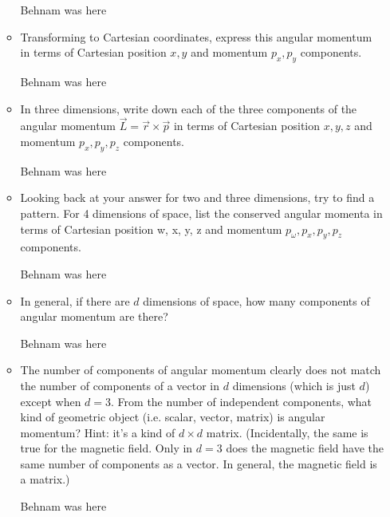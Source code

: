 \documentclass[fleqn]{article}
\begin{document}
\begin{enumerate}
\begin{itemize}
        \textcolor{hwColor}{
          Behnam was here
        }

      \item Transforming to Cartesian coordinates, express this angular momentum in terms of Cartesian position
      $x, y$ and momentum $p_x, p_y$ components.

        \textcolor{hwColor}{
          Behnam was here
        }

      \item In three dimensions, write down each of the three components of
      the angular momentum $\overrightarrow{L}=\overrightarrow{r} \times \overrightarrow{p}$ in terms of Cartesian position
      $x,y,z$ and momentum $p_x, p_y, p_z$ components.

        \textcolor{hwColor}{
          Behnam was here
        }

      \item Looking back at your answer for two and three dimensions, try
      to find a pattern. For 4 dimensions of space, list the conserved
      angular momenta in terms of Cartesian position w, x, y, z and momentum $p_{\omega}, p_x, p_y,p_z$ components.

        \textcolor{hwColor}{
          Behnam was here
        }
  
      \item In general, if there are $d$ dimensions of space, how many components of angular momentum are there?

        \textcolor{hwColor}{
          Behnam was here
        }

      \item The number of components of angular momentum clearly does not match the number of components of a vector in $d$ dimensions
      (which is just $d$) except when $d=3$. From the number of independent components, what kind of geometric object (i.e. scalar,
      vector, matrix) is angular momentum?
      Hint: it’s a kind of $d \times d$ matrix. (Incidentally, the same is true for the magnetic field. Only 
      in $d=3$ does the magnetic field have the same number of components as a vector. In general, the magnetic field is a matrix.)
    
        \textcolor{hwColor}{
          Behnam was here 
        }

    \end{itemize}
    
  \end{enumerate}
\end{document}
